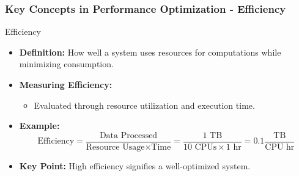\documentclass{beamer}
\begin{document}
\begin{frame}[fragile]
    \frametitle{Key Concepts in Performance Optimization - Efficiency}

    \begin{block}{Efficiency}
        \begin{itemize}
            \item \textbf{Definition:} How well a system uses resources for computations while minimizing consumption.
            \item \textbf{Measuring Efficiency:} 
            \begin{itemize}
                \item Evaluated through resource utilization and execution time.
            \end{itemize}
            \item \textbf{Example:}
            \begin{equation}
                \text{Efficiency} = \frac{\text{Data Processed}}{\text{Resource Usage} \times \text{Time}} = \frac{1 \text{ TB}}{10 \text{ CPUs} \times 1 \text{ hr}} = 0.1 \frac{\text{TB}}{\text{CPU hr}}
            \end{equation}
            \item \textbf{Key Point:} High efficiency signifies a well-optimized system.
        \end{itemize}
    \end{block}

\end{frame}
\end{document}
